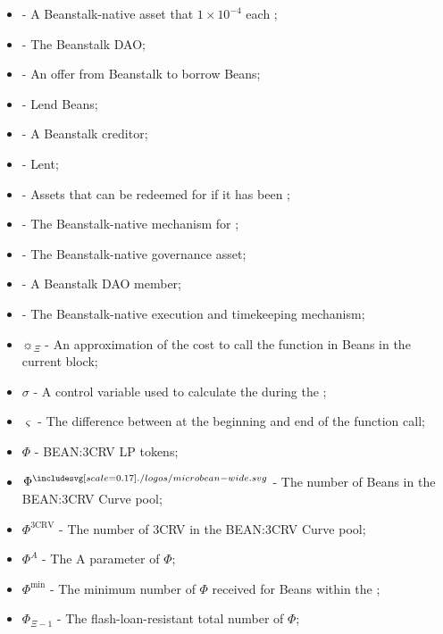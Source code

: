 \documentclass[class=article, crop=false]{standalone}
\begin{document}
\begin{itemize}[topsep=0pt, itemsep=3pt,leftmargin=16pt]
    \item[]  - \hypertarget{ht176}{A Beanstalk-native asset that  $1 \times 10^{-4}$  each };
    \item[]  - \hypertarget{ht177}{The Beanstalk DAO};
    \item[]  - \hypertarget{ht178}{An offer from Beanstalk to borrow Beans};
    \item[]  - \hypertarget{ht179}{Lend Beans};
    \item[]  - \hypertarget{ht180}{A Beanstalk creditor};
    \item[]  - \hypertarget{ht181}{Lent};
    \item[]  - \hypertarget{ht182}{Assets that can be redeemed for  if it has been };
    \item[]  - \hypertarget{ht183}{The Beanstalk-native mechanism for };
    \item[]  - \hypertarget{ht184}{The Beanstalk-native governance asset};
    \item[]  - \hypertarget{ht185}{A Beanstalk DAO member};
    \item[]  - \hypertarget{ht186}{The Beanstalk-native execution and timekeeping mechanism};
    \item[] $\sun_{\Xi}$ - An approximation of the cost to call the  function in Beans in the current block;
    \item[] $\sigma$ - A control variable used to calculate the  during the ;
    \item[] $\varsigma$ - The difference between  at the beginning and end of the  function call;
    \item[] $\Phi$ - \hypertarget{ht187}{BEAN:3CRV LP tokens};
    \item[] $\Phi^{\bean}$ - \hypertarget{ht188}{The number of Beans in the BEAN:3CRV Curve pool};
    \item[] $\Phi^{\text{3CRV}}$ - \hypertarget{ht189}{The number of 3CRV in the BEAN:3CRV Curve pool};
    \item[] $\Phi^{A}$ - \hypertarget{ht190}{The A parameter of $\Phi$};
    \item[] $\Phi^{\text{min}}$ - \hypertarget{ht191}{The minimum number of $\Phi$ received for   Beans within the };
    \item[] $\Phi_{\Xi-1}$ - \hypertarget{ht192}{The flash-loan-resistant total number of $\Phi$};

\end{itemize}
\end{document}
